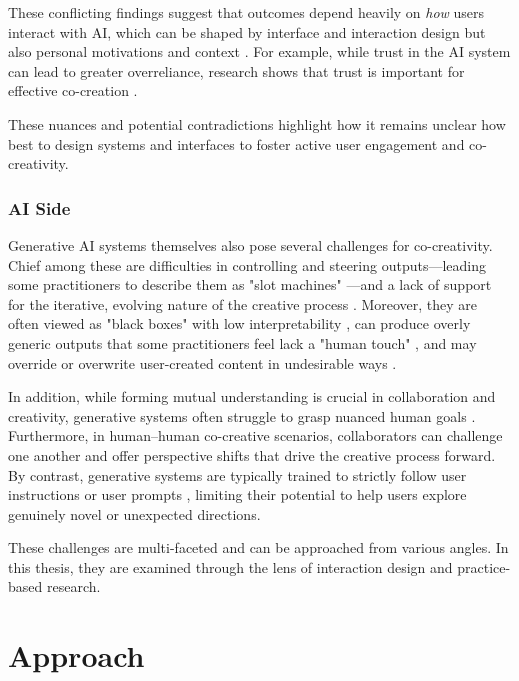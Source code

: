 These conflicting findings suggest that outcomes depend heavily on \emph{how} users interact with AI, which can be shaped by interface and interaction design but also personal motivations and context \cite{Lehmann2022-kr, Kantosalo2020-nh,Liapis2016-bv,Lin2023-jd,Karimi2020-cf,Moruzzi2024-cq, Rezwana2022-gg,Abbas2024-sf}. For example, while trust in the AI system can lead to greater overreliance, research shows that trust is important for effective co-creation \cite{McCormack2019-yh, Louie2020-aq, Kruger2017-xa, McCormack2020-ix, Hutchings2020-bv, Wang2020-cw, Rezwana2022-ui}. 

These nuances and potential contradictions highlight how it remains unclear how best to design systems and interfaces to foster active user engagement and co-creativity. 

\subsubsection{AI Side}
Generative AI systems themselves also pose several challenges for co-creativity. Chief among these are difficulties in controlling and steering outputs—leading some practitioners to describe them as "slot machines" \cite{Nebelong2023-rb}—and a lack of support for the iterative, evolving nature of the creative process \cite{Park2024-gw}. Moreover, they are often viewed as "black boxes" with low interpretability \cite{Llano2022-ti, El-Assady2022-qc}, can produce overly generic outputs that some practitioners feel lack a "human touch" \cite{Park2024-gw}, and may override or overwrite user-created content in undesirable ways \cite{Buschek2021-ks}.

In addition, while forming mutual understanding is crucial in collaboration and creativity, generative systems often struggle to grasp nuanced human goals \cite{Bown2024-yx}. Furthermore, in human–human co-creative scenarios, collaborators can challenge one another and offer perspective shifts that drive the creative process forward. By contrast, generative systems are typically trained to strictly follow user instructions \cite{OpenAI2022-pj} or user prompts \cite{Ramesh2022-kc}, limiting their potential to help users explore genuinely novel or unexpected directions.

These challenges are multi-faceted and can be approached from various angles. In this thesis, they are examined through the lens of interaction design and practice-based research. 

\section{Approach}

